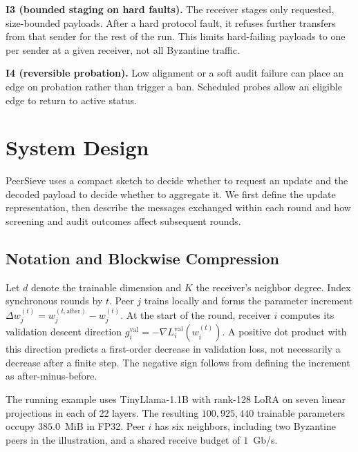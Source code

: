 \documentclass{article}
\begin{document}
\textbf{I3 (bounded staging on hard faults).} The receiver stages only requested, size-bounded payloads. After a hard protocol fault, it refuses further transfers from that sender for the rest of the run. This limits hard-failing payloads to one per sender at a given receiver, not all Byzantine traffic.

\textbf{I4 (reversible probation).} Low alignment or a soft audit failure can place an edge on probation rather than trigger a ban. Scheduled probes allow an eligible edge to return to active status.

\section{System Design}
\label{sec:design}

PeerSieve uses a compact sketch to decide whether to request an update and the decoded payload to decide whether to aggregate it. We first define the update representation, then describe the messages exchanged within each round and how screening and audit outcomes affect subsequent rounds.

\subsection{Notation and Blockwise Compression}

Let $d$ denote the trainable dimension and $K$ the receiver's neighbor degree. Index synchronous rounds by $t$. Peer $j$ trains locally and forms the parameter increment $\Delta w_j^{(t)} = w_j^{(t,\mathrm{after})} - w_j^{(t)}$. At the start of the round, receiver $i$ computes its validation descent direction $g_i^{\mathrm{val}} = -\nabla L_i^{\mathrm{val}}(w_i^{(t)})$. A positive dot product with this direction predicts a first-order decrease in validation loss, not necessarily a decrease after a finite step. The negative sign follows from defining the increment as after-minus-before.

The running example uses TinyLlama-1.1B with rank-128 LoRA on seven linear projections in each of 22 layers. The resulting $100{,}925{,}440$ trainable parameters occupy $385.0$~MiB in FP32. Peer $i$ has six neighbors, including two Byzantine peers in the illustration, and a shared receive budget of $1$~Gb/s.
\end{document}
